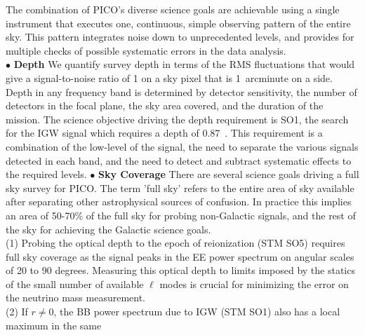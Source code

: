 \documentclass[PICOReport.tex]{subfiles}
\begin{document}
The combination of PICO's diverse science goals are achievable using a single instrument that executes 
one, continuous, simple observing pattern of the entire sky. This pattern integrates noise down to unprecedented levels, 
and provides for multiple checks of possible systematic errors in the data analysis. \\
%
$\bullet$ {\bf Depth} \hspace{0.1in} We quantify survey depth in terms of the RMS fluctuations that would give
a signal-to-noise ratio of 1 on a sky pixel that is 1~arcminute on a side. Depth in any frequency band 
is determined by detector sensitivity, the number of detectors in the focal plane, the sky area covered, and the 
duration of the mission.  The science objective driving 
the depth requirement is SO1, the search for the IGW signal which 
requires a depth of 0.87~\microkamin. This requirement is a combination of the low-level of the signal, the need
to separate the various signals detected in each band, and the need to detect and subtract systematic effects 
to the required levels.  
%
$\bullet$ {\bf Sky Coverage} \hspace{0.1in} There are several science goals driving a full sky survey for PICO. The 
term 'full sky' refers to the entire area of sky available after separating other astrophysical sources of confusion. In 
practice this implies an area of 50-70\% of the full sky for probing non-Galactic signals, and the rest of the sky
for achieving the Galactic science goals. \\
(1) Probing the optical depth to the epoch of reionization (STM SO5) requires full sky 
coverage as the signal peaks in the EE power spectrum on angular scales of 20 to 90 degrees. Measuring 
this optical depth to limits imposed by the statics of the small number of available $\ell$ modes is crucial 
for minimizing the error on the neutrino mass measurement. \\   
(2) If $r \ne 0 $, the BB power spectrum due to IGW (STM SO1) also has a local maximum in the same
\end{document}
